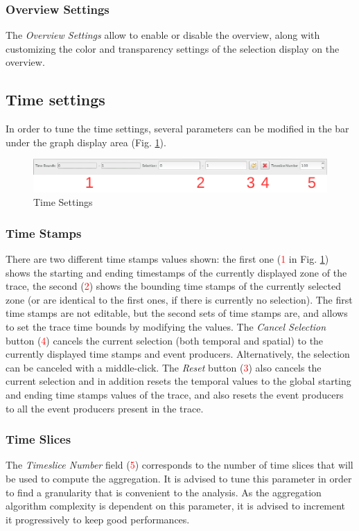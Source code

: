 \documentclass[twoside]{article}
\begin{document}
\begin{sloppypar}
\subsubsection{Overview Settings}
The \textit{Overview Settings} allow to enable or disable the overview, along with customizing the color and transparency settings of the selection display on the overview.


\subsection{Time settings}
In order to tune the time settings, several parameters can be modified in the bar under the graph display area (Fig. \ref{timeSettings}).
 
\begin{figure}[h!]
	\centering
	\includegraphics[width=1.0\textwidth]{images/ocelotl_bottom_time.pdf}
	\caption{Time Settings}
	\label{timeSettings}
\end{figure}

\subsubsection{Time Stamps}
There are two different time stamps values shown: the first one (\textcolor{red}{1} in Fig. \ref{timeSettings}) shows the starting and ending timestamps of the currently displayed zone of the trace, the second (\textcolor{red}{2}) shows the bounding time stamps of the currently selected zone (or are identical to the first ones, if there is currently no selection). The first time stamps are not editable, but the second sets of time stamps are, and allows to set the trace time bounds by modifying the values. The \textit{Cancel Selection} button  (\textcolor{red}{4}) cancels the current selection (both temporal and spatial) to the currently displayed time stamps and event producers. Alternatively, the selection can be canceled with a middle-click. The \textit{Reset} button (\textcolor{red}{3}) also cancels the current selection and in addition resets the temporal values to the global starting and ending time stamps values of the trace, and also resets the event producers to all the event producers present in the trace.

\subsubsection{Time Slices}
The \textit{Timeslice Number} field (\textcolor{red}{5}) corresponds to the number of time slices that will be used to compute the aggregation. It is advised to tune this parameter in order to find a granularity that is convenient to the analysis. As the aggregation algorithm complexity is dependent on this parameter, it is advised to increment it progressively to keep good performances.


\end{sloppypar}
\end{document}
